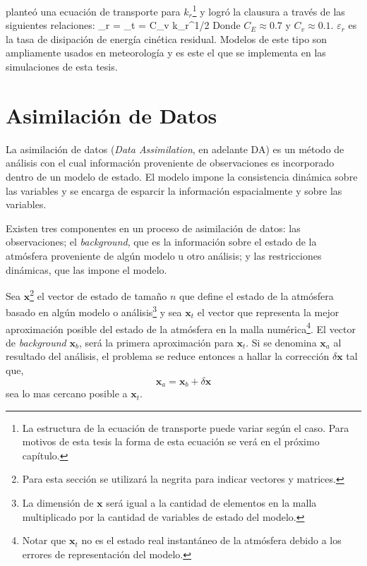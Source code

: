 \cite{deardorff1974three} planteó una ecuación de transporte para $k_r$\footnote{La estructura de la ecuación de transporte puede variar según el caso. Para motivos de esta tesis la forma de esta ecuación se verá en el próximo capítulo.} y logró la clausura a través de las siguientes relaciones:
\be \varepsilon_r =  \ee
\be \nu_t = C_v k_r^{1/2}\Delta \ee
Donde $C_E\approx 0.7$ y $C_v\approx 0.1$. $\varepsilon_r$ es la tasa de disipación de energía cinética residual. Modelos de este tipo son ampliamente usados en meteorología y es este el que se implementa en las simulaciones de esta tesis.
\newpage
\section{Asimilación de Datos}
La asimilación de datos (\emph{Data Assimilation}, en adelante DA) es un método de análisis con el cual información proveniente de observaciones es incorporado dentro de un modelo de estado. El modelo impone la consistencia dinámica sobre las variables y se encarga de esparcir la información espacialmente y sobre las variables.

Existen tres componentes en un proceso de asimilación de datos: las observaciones; el \emph{background}, que es la información sobre el estado de la atmósfera proveniente de algún modelo u otro análisis; y las restricciones dinámicas, que las impone el modelo.

Sea $\mathbf{x}$\footnote{Para esta sección se utilizará la negrita para indicar vectores y matrices.} el vector de estado de tamaño $n$ que define el estado de la atmósfera basado en algún modelo o análisis\footnote{La dimensión de $\mathbf{x}$ será igual a la cantidad de elementos en la malla multiplicado por la cantidad de variables de estado del modelo.} y sea $\mathbf{x}_t$ el vector que representa la mejor aproximación posible del estado de la atmósfera en la malla numérica\footnote{Notar que $\mathbf{x}_t$ no es el estado real instantáneo de la atmósfera debido a los errores de representación del modelo.}. El vector de \emph{background} $\mathbf{x}_b$, será la primera aproximación para $\mathbf{x}_t$. Si se denomina $\mathbf{x}_a$ al resultado del análisis, el problema se reduce entonces a hallar la corrección $\delta \mathbf{x}$ tal que,
\begin{equation*}
	\mathbf{x}_a = \mathbf{x}_b + \delta \mathbf{x}
\end{equation*}
sea lo mas cercano posible a $\mathbf{x}_t$.

